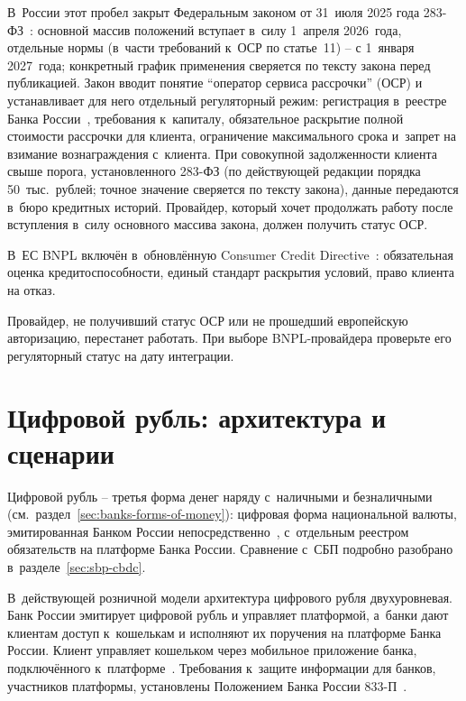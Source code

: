 В~России этот пробел закрыт Федеральным законом от 31~июля
2025 года 283-ФЗ~\cite{fz-283}: основной массив положений
вступает в~силу 1~апреля 2026~года, отдельные нормы (в~части
требований к~ОСР по статье~11) -- с 1~января 2027~года;
конкретный график применения сверяется по тексту закона
перед публикацией. Закон вводит понятие \enquote{оператор
сервиса рассрочки} (ОСР) и устанавливает для него отдельный
регуляторный режим: регистрация в~реестре Банка
России~\cite{cbr-osr}, требования к~капиталу, обязательное
раскрытие полной стоимости рассрочки для клиента, ограничение
максимального срока и~запрет на взимание вознаграждения
с~клиента. При совокупной задолженности клиента свыше
порога, установленного 283-ФЗ (по действующей редакции
порядка 50~тыс.\ рублей; точное значение сверяется по тексту
закона), данные передаются в~бюро кредитных историй.
Провайдер, который хочет продолжать работу после вступления
в~силу основного массива закона, должен получить статус ОСР.

В~ЕС BNPL включён в~обновлённую Consumer Credit
Directive~\cite{eu-ccd-2023}: обязательная оценка
кредитоспособности, единый стандарт раскрытия условий, право
клиента на отказ.

Провайдер, не получивший статус ОСР или не прошедший
европейскую авторизацию, перестанет работать. При выборе
BNPL-провайдера проверьте его регуляторный статус на дату
интеграции.

\section{Цифровой рубль: архитектура и сценарии}\label{sec:alt-digital-ruble}

Цифровой рубль -- третья форма денег наряду с~наличными и безналичными
(см.\ раздел~\ref{sec:banks-forms-of-money}): цифровая форма
национальной валюты, эмитированная Банком России
непосредственно~\cite{fz-340,cbr-digital-ruble}, с~отдельным реестром
обязательств на платформе Банка России.
Сравнение с~СБП подробно разобрано в~разделе~\ref{sec:sbp-cbdc}.

В~действующей розничной модели архитектура цифрового рубля
двухуровневая. Банк России эмитирует цифровой рубль и управляет
платформой, а~банки дают клиентам доступ к~кошелькам и исполняют
их поручения на платформе Банка России. Клиент управляет кошельком
через мобильное приложение банка, подключённого к~платформе~\cite{cbr-digital-ruble}.
Требования к~защите информации для банков, участников платформы,
установлены Положением Банка России
833-П~\cite{cbr-833p}.

